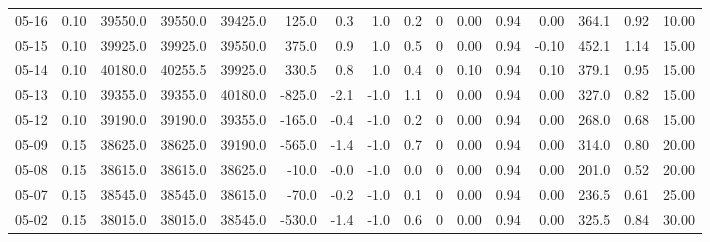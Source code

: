 \begin{threeparttable}
{\begin{tabular}{lrrrrrrrrrrrrrrr}
  05-16 &     0.10 & 39550.0 & 39550.0 & 39425.0 &      125.0 &            0.3 &                      1.0 &                 0.2 &              0 &       0.00 &      0.94 &           0.00 &            364.1 &            0.92 &                  10.00 \\
  05-15 &     0.10 & 39925.0 & 39925.0 & 39550.0 &      375.0 &            0.9 &                      1.0 &                 0.5 &              0 &       0.00 &      0.94 &          -0.10 &            452.1 &            1.14 &                  15.00 \\
  05-14 &     0.10 & 40180.0 & 40255.5 & 39925.0 &      330.5 &            0.8 &                      1.0 &                 0.4 &              0 &       0.10 &      0.94 &           0.10 &            379.1 &            0.95 &                  15.00 \\
  05-13 &     0.10 & 39355.0 & 39355.0 & 40180.0 &     -825.0 &           -2.1 &                     -1.0 &                 1.1 &              0 &       0.00 &      0.94 &           0.00 &            327.0 &            0.82 &                  15.00 \\
  05-12 &     0.10 & 39190.0 & 39190.0 & 39355.0 &     -165.0 &           -0.4 &                     -1.0 &                 0.2 &              0 &       0.00 &      0.94 &           0.00 &            268.0 &            0.68 &                  15.00 \\
  05-09 &     0.15 & 38625.0 & 38625.0 & 39190.0 &     -565.0 &           -1.4 &                     -1.0 &                 0.7 &              0 &       0.00 &      0.94 &           0.00 &            314.0 &            0.80 &                  20.00 \\
  05-08 &     0.15 & 38615.0 & 38615.0 & 38625.0 &      -10.0 &           -0.0 &                     -1.0 &                 0.0 &              0 &       0.00 &      0.94 &           0.00 &            201.0 &            0.52 &                  20.00 \\
  05-07 &     0.15 & 38545.0 & 38545.0 & 38615.0 &      -70.0 &           -0.2 &                     -1.0 &                 0.1 &              0 &       0.00 &      0.94 &           0.00 &            236.5 &            0.61 &                  25.00 \\
  05-02 &     0.15 & 38015.0 & 38015.0 & 38545.0 &     -530.0 &           -1.4 &                     -1.0 &                 0.6 &              0 &       0.00 &      0.94 &           0.00 &            325.5 &            0.84 &                  30.00 \\

\end{tabular}}
\end{threeparttable}
